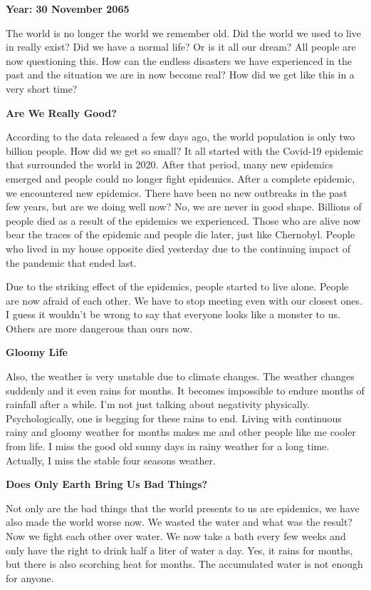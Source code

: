 \documentclass[]{book}
\begin{document}
\textbf{Year: 30 November 2065}

The world is no longer the world we remember old. Did the world we used to live in really exist? Did we have a normal life? Or is it all our dream? All people are now questioning this. How can the endless disasters we have experienced in the past and the situation we are in now become real? How did we get like this in a very short time?

\textbf{Are We Really Good?}

According to the data released a few days ago, the world population is only two billion people. How did we get so small? It all started with the Covid-19 epidemic that surrounded the world in 2020. After that period, many new epidemics emerged and people could no longer fight epidemics. After a complete epidemic, we encountered new epidemics. There have been no new outbreaks in the past few years, but are we doing well now? No, we are never in good shape. Billions of people died as a result of the epidemics we experienced. Those who are alive now bear the traces of the epidemic and people die later, just like Chernobyl. People who lived in my house opposite died yesterday due to the continuing impact of the pandemic that ended last.

Due to the striking effect of the epidemics, people started to live alone. People are now afraid of each other. We have to stop meeting even with our closest ones. I guess it wouldn't be wrong to say that everyone looks like a monster to us. Others are more dangerous than ours now.

\textbf{Gloomy Life}

Also, the weather is very unstable due to climate changes. The weather changes suddenly and it even rains for months. It becomes impossible to endure months of rainfall after a while. I'm not just talking about negativity physically. Psychologically, one is begging for these rains to end. Living with continuous rainy and gloomy weather for months makes me and other people like me cooler from life. I miss the good old sunny days in rainy weather for a long time. Actually, I miss the stable four seasons weather.

\textbf{Does Only Earth Bring Us Bad Things?}

Not only are the bad things that the world presents to us are epidemics, we have also made the world worse now. We wasted the water and what was the result? Now we fight each other over water. We now take a bath every few weeks and only have the right to drink half a liter of water a day. Yes, it rains for months, but there is also scorching heat for months. The accumulated water is not enough for anyone.
\end{document}
